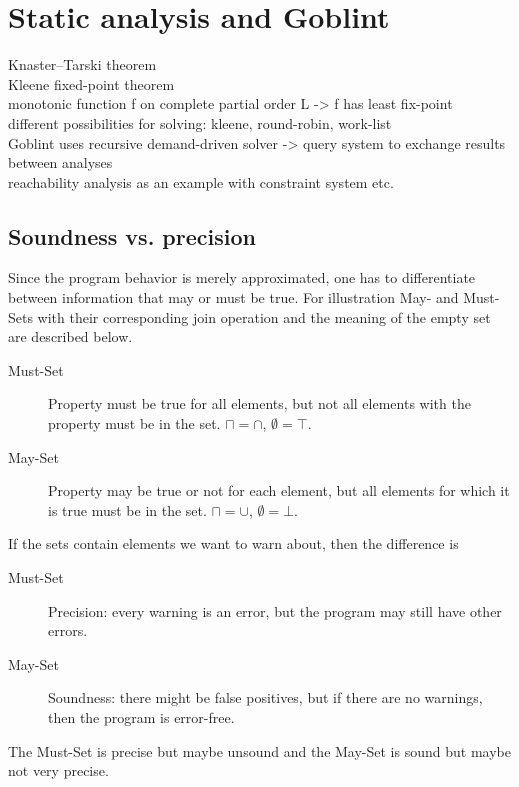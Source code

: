 


\chapter{Static analysis and Goblint} %
Knaster–Tarski theorem\\
Kleene fixed-point theorem\\
monotonic function f on complete partial order L -> f has least fix-point\\
different possibilities for solving: kleene, round-robin, work-list\\
Goblint uses recursive demand-driven solver -> query system to exchange results between analyses\\
reachability analysis as an example with constraint system etc.\\

\section{Soundness vs. precision}
Since the program behavior is merely approximated, one has to differentiate between information that may or must be true. For illustration May- and Must-Sets with their corresponding join operation and the meaning of the empty set are described below.
\begin{description}
\item[Must-Set] Property must be true for all elements, but not all elements with the property must be in the set. $\sqcap = \cap$, $\emptyset = \top$.
\item[May-Set] Property may be true or not for each element, but all elements for which  it is true must be in the set. $\sqcap = \cup$, $\emptyset = \bot$.
\end{description}
If the sets contain elements we want to warn about, then the difference is
\begin{description}
\item[Must-Set] Precision: every warning is an error, but the program may still have other errors.
\item[May-Set] Soundness: there might be false positives, but if there are no warnings, then the program is error-free.
\end{description}
The Must-Set is precise but maybe unsound and the May-Set is sound but maybe not very precise.


